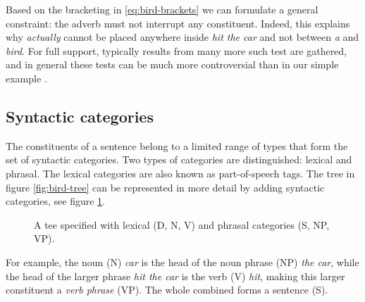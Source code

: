 Based on the bracketing in \ref{eq:bird-brackets} we can formulate a general constraint: the adverb must not interrupt any constituent. Indeed, this explains why \textit{actually} cannot be placed anywhere inside \textit{hit the car} and not between \textit{a} and \textit{bird}. For full support, typically results from many more such test are gathered, and in general these tests can be much more controversial than in our simple example \citep{carnie2010constituent}.

\subsection{Syntactic categories} The constituents of a sentence belong to a limited range of types that form the set of syntactic categories. Two types of categories are distinguished: lexical and phrasal. The lexical categories are also known as part-of-speech tags. The tree in figure \ref{fig:bird-tree} can be represented in more detail by adding syntactic categories, see figure \ref{fig:bird-tree-labeled}.
\begin{figure}[h]{\textwidth}
  \center
  \caption{A tee specified with lexical (D, N, V) and phrasal categories (S, NP, VP).}
  \label{fig:bird-tree-labeled}
\end{figure}
For example, the noun (N) \textit{car} is the head of the noun phrase (NP) \textit{the car}, while the head of the larger phrase \textit{hit the car} is the verb (V) \textit{hit}, making this larger constituent a \textit{verb phrase} (VP). The whole combined forms a sentence (S).

